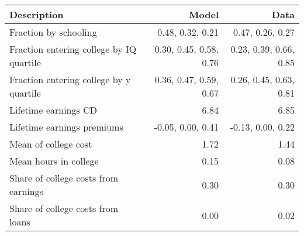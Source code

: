 \begin{tabular}{lrr}
\hline
Description & Model  & Data  \\ 
\hline
Fraction by schooling & 0.48, 0.32, 0.21  & 0.47, 0.26, 0.27  \\ 
Fraction entering college by IQ quartile & 0.30, 0.45, 0.58, 0.76  & 0.23, 0.39, 0.66, 0.85  \\ 
Fraction entering college by y quartile & 0.36, 0.47, 0.59, 0.67  & 0.26, 0.45, 0.63, 0.81  \\ 
Lifetime earnings CD & 6.84  & 6.85  \\ 
Lifetime earnings premiums & -0.05, 0.00, 0.41  & -0.13, 0.00, 0.22  \\ 
Mean of college cost & 1.72  & 1.44  \\ 
Mean hours in college & 0.15  & 0.08  \\ 
Share of college costs from earnings & 0.30  & 0.30  \\ 
Share of college costs from loans & 0.00  & 0.02  \\ 
\hline
\end{tabular}%
